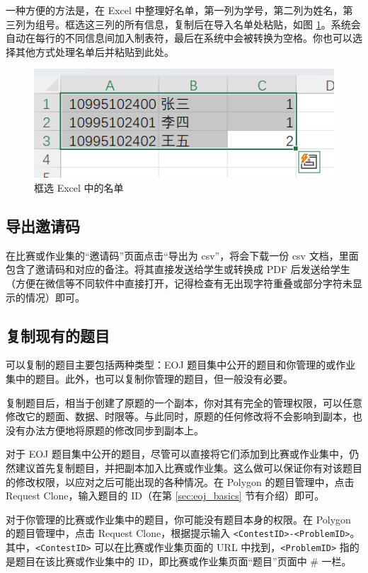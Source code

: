 \documentclass[oneside]{book}
\begin{document}
一种方便的方法是，在 Excel 中整理好名单，第一列为学号，第二列为姓名，第三列为组号。框选这三列的所有信息，复制后在导入名单处粘贴，如图 \ref{fig:excel}。系统会自动在每行的不同信息间加入制表符，最后在系统中会被转换为空格。你也可以选择其他方式处理名单后并粘贴到此处。

\begin{figure}[htbp]
  \centering
  \includegraphics[width=.5\textwidth]{res/excel.png}
  \caption{框选 Excel 中的名单}
  \label{fig:excel}
\end{figure}

\subsection{导出邀请码}

\label{ssec:export_inviting_code}

在比赛或作业集的``邀请码''页面点击``导出为 csv''，将会下载一份 csv 文档，里面包含了邀请码和对应的备注。将其直接发送给学生或转换成 PDF 后发送给学生（方便在微信等不同软件中直接打开，记得检查有无出现字符重叠或部分字符未显示的情况）即可。

\subsection{复制现有的题目}

\label{ssec:copy_exist_problem}

可以复制的题目主要包括两种类型：EOJ 题目集中公开的题目和你管理的或作业集中的题目。此外，也可以复制你管理的题目，但一般没有必要。

复制题目后，相当于创建了原题的一个副本，你对其有完全的管理权限，可以任意修改它的题面、数据、时限等。与此同时，原题的任何修改将不会影响到副本，也没有办法方便地将原题的修改同步到副本上。

对于 EOJ 题目集中公开的题目，尽管可以直接将它们添加到比赛或作业集中，仍然建议首先复制题目，并把副本加入比赛或作业集。这么做可以保证你有对该题目的修改权限，以应对之后可能出现的各种情况。在 Polygon 的题目管理中，点击 Request Clone，输入题目的 ID（在第 \ref{sec:eoj_basics} 节有介绍）即可。

对于你管理的比赛或作业集中的题目，你可能没有题目本身的权限。在 Polygon 的题目管理中，点击 Request Clone，根据提示输入 \lstinline{<ContestID>-<ProblemID>}。其中，\lstinline{<ContestID>} 可以在比赛或作业集页面的 URL 中找到，\lstinline{<ProblemID>} 指的是题目在该比赛或作业集中的 ID，即比赛或作业集页面``题目''页面中 \# 一栏。
\end{document}
